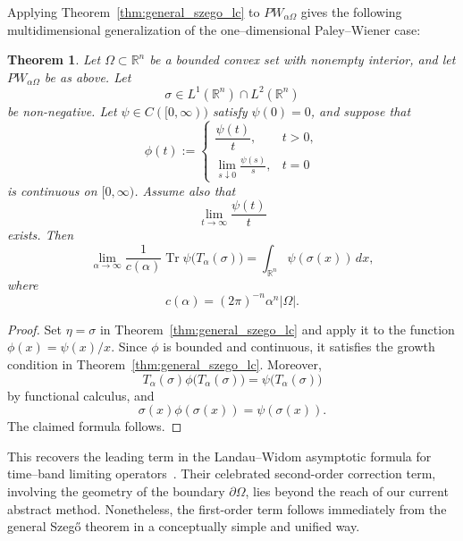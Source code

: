 \documentclass{amsart}
\newtheorem{thm}{Theorem}[section]
\theoremstyle{definition}
\theoremstyle{remark}
\numberwithin{equation}{section}
\begin{document}
\medskip

Applying Theorem~\ref{thm:general_szego_lc} to $PW_{\alpha\Omega}$ gives the following 
multidimensional generalization of the one--dimensional Paley--Wiener case:

\begin{thm}
Let $\Omega\subset\mathbb{R}^n$ be a bounded convex set with
nonempty interior, and let $PW_{\alpha\Omega}$ be as above. Let
\[
\sigma\in L^1(\mathbb{R}^n)\cap L^2(\mathbb{R}^n)
\]
be non-negative. Let $\psi\in C([0,\infty))$ satisfy $\psi(0)=0$,
and suppose that
\[
\phi(t):=
\begin{cases}
\dfrac{\psi(t)}{t},&t>0,\\[2mm]
\displaystyle\lim_{s\downarrow0}\frac{\psi(s)}{s},&t=0
\end{cases}
\]
is continuous on $[0,\infty)$. Assume also that
\[
\lim_{t\to\infty}\frac{\psi(t)}{t}
\]
exists. Then
\[
\lim_{\alpha\to\infty}
\frac{1}{c(\alpha)}
\operatorname{Tr}\psi\bigl(T_\alpha(\sigma)\bigr)
=
\int_{\mathbb{R}^n}\psi(\sigma(x))\,dx,
\]
where
\[
c(\alpha)=(2\pi)^{-n}\alpha^n|\Omega|.
\]
\end{thm}

\begin{proof} Set $\eta=\sigma$ in Theorem~\ref{thm:general_szego_lc} and apply it to the function
$\phi(x)=\psi(x)/x$. Since $\phi$ is bounded and
continuous, it satisfies the growth condition in Theorem~\ref{thm:general_szego_lc}.
Moreover,
\[
T_\alpha(\sigma)\phi\bigl(T_\alpha(\sigma)\bigr)
=
\psi\bigl(T_\alpha(\sigma)\bigr)
\]
by functional calculus, and
\[
\sigma(x)\phi(\sigma(x))=\psi(\sigma(x)).
\]
The claimed formula follows.
    
\end{proof}
    


This recovers the leading term in the Landau--Widom asymptotic formula 
for time--band limiting operators~\cite{landau1980eigenvalue}.
Their celebrated second-order correction term, 
involving the geometry of the boundary $\partial\Omega$,
lies beyond the reach of our current abstract method.
Nonetheless, the first-order term follows immediately from the
general Szeg\H{o} theorem in a conceptually simple and unified way.
\end{document}
